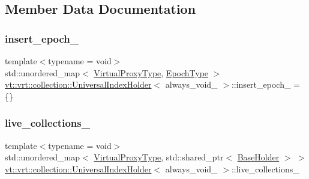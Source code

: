 \subsection{Member Data Documentation}
\mbox{\label{structvt_1_1vrt_1_1collection_1_1_universal_index_holder_a9fbea00587a7d5028c3ae3cf124a3930}} 
\subsubsection{\texorpdfstring{insert\+\_\+epoch\+\_\+}{insert\_epoch\_}}
{\footnotesize\ttfamily template$<$typename  = void$>$ \\
std\+::unordered\+\_\+map$<$ \hyperlink{namespacevt_a1b417dd5d684f045bb58a0ede70045ac}{Virtual\+Proxy\+Type}, \hyperlink{namespacevt_a985a5adf291c34a3ca263b3378388236}{Epoch\+Type} $>$ \hyperlink{structvt_1_1vrt_1_1collection_1_1_universal_index_holder}{vt\+::vrt\+::collection\+::\+Universal\+Index\+Holder}$<$ always\+\_\+void\+\_\+ $>$\+::insert\+\_\+epoch\+\_\+ = \{\}\hspace{0.3cm}{\ttfamily [static]}}

\mbox{\label{structvt_1_1vrt_1_1collection_1_1_universal_index_holder_af67ddae79d782cc9c51a13e34997cd59}} 
\subsubsection{\texorpdfstring{live\+\_\+collections\+\_\+}{live\_collections\_}}
{\footnotesize\ttfamily template$<$typename  = void$>$ \\
std\+::unordered\+\_\+map$<$ \hyperlink{namespacevt_a1b417dd5d684f045bb58a0ede70045ac}{Virtual\+Proxy\+Type}, std\+::shared\+\_\+ptr$<$ \hyperlink{structvt_1_1vrt_1_1collection_1_1_base_holder}{Base\+Holder} $>$ $>$ \hyperlink{structvt_1_1vrt_1_1collection_1_1_universal_index_holder}{vt\+::vrt\+::collection\+::\+Universal\+Index\+Holder}$<$ always\+\_\+void\+\_\+ $>$\+::live\+\_\+collections\+\_\+\hspace{0.3cm}{\ttfamily [static]}}

